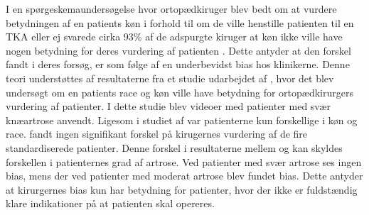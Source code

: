 I en spørgeskemaundersøgelse hvor ortopædkiruger blev bedt om at vurdere betydningen af en patients køn i forhold til om de ville henstille patienten til en TKA eller ej svarede cirka 93\% af de adspurgte kiruger at køn ikke ville have nogen betydning for deres vurdering af patienten \citep{wright1995}. Dette antyder at den forskel \cite{borkhoff2008} fandt i deres forsøg, er som følge af en underbevidst bias hos klinikerne. Denne teori understøttes af resultaterne fra et studie udarbejdet af \cite{dy2014}, hvor det blev undersøgt om en patients race og køn ville have betydning for ortopædkirurgers vurdering af patienter. I dette studie blev videoer med patienter med svær knæartrose anvendt. Ligesom i studiet af \cite{borkhoff2008} var patienterne kun forskellige i køn og race. \cite{dy2014} fandt ingen signifikant forskel på kirugernes vurdering af de fire standardiserede patienter. Denne forskel i resultaterne mellem \cite{borkhoff2008} og \cite{dy2014} kan skyldes forskellen i patienternes grad af artrose. Ved patienter med svær artrose ses ingen bias, mens der ved patienter med moderat artrose blev fundet bias. Dette antyder at kirurgernes bias kun har betydning for patienter, hvor der ikke er fuldstændig klare indikationer på at patienten skal opereres. 

